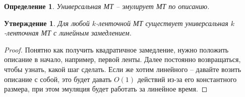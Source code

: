 \documentclass[12pt, letterpaper]{article}
\newtheorem{prop}{Утверждение}[section]
\newtheorem{defi}{Определение}[section]
\begin{document}
\begin{defi}
Универсальная МТ -- эмулирует МТ по описанию.
\end{defi}

\begin{prop}
Для любой $k$-ленточной МТ существует универсальная $k$-ленточная МТ с линейным замедлением.
\end{prop}
\begin{proof}
Понятно как получить квадратичное замедление, нужно положить описание в начало, например, первой ленты. Далее постоянно возвращаться, чтобы узнать, какой шаг сделать. Если же хотим линейного -- давайте возить описание с собой, это будет давать $O(1)$ действий из-за его константного размера, при этом эмуляция будет работать за линейное время.
\end{proof}
\end{document}
